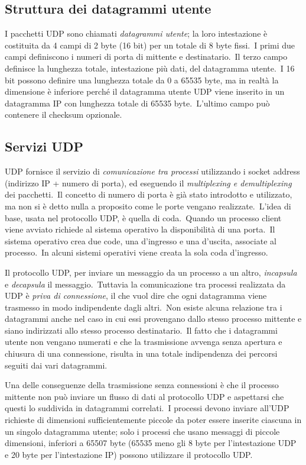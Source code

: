 \subsection{Struttura dei datagrammi utente}

I pacchetti UDP sono chiamati \emph{datagrammi utente}; la loro intestazione è costituita da 4 campi di 2 byte (16 bit) per un totale di 8 byte fissi.\
I primi due campi definiscono i numeri di porta di mittente e destinatario.\
Il terzo campo definisce la lunghezza totale, intestazione più dati, del datagramma utente.\
I 16 bit possono definire una lunghezza totale da 0 a 65535 byte, ma in realtà la dimensione è inferiore perché il datagramma utente UDP viene inserito in un datagramma IP con lunghezza totale di 65535 byte.\
L'ultimo campo può contenere il checksum opzionale.

\subsection{Servizi UDP}

UDP fornisce il servizio di \emph{comunicazione tra processi} utilizzando i socket address (indirizzo IP + numero di porta), ed eseguendo il \emph{multiplexing e demultiplexing} dei pacchetti.\
Il concetto di numero di porta è già stato introdotto e utilizzato, ma non si è detto nulla a proposito come le porte vengano realizzate.\
L'idea di base, usata nel protocollo UDP, è quella di coda.\
Quando un processo client viene avviato richiede al sistema operativo la disponibilità di una porta.\
Il sistema operativo crea due code, una d'ingresso e una d'uscita, associate al processo.\
In alcuni sistemi operativi viene creata la sola coda d'ingresso.

Il protocollo UDP, per inviare un messaggio da un processo a un altro, \emph{incapsula} e \emph{decapsula} il messaggio.\
Tuttavia la comunicazione tra processi realizzata da UDP è \emph{priva di connessione}, il che vuol dire che ogni datagramma viene trasmesso in modo indipendente dagli altri.\
Non esiste alcuna relazione tra i datagrammi anche nel caso in cui essi provengano dallo stesso processo mittente e siano indirizzati allo stesso processo destinatario.\
Il fatto che i datagrammi utente non vengano numerati e che la trasmissione avvenga senza apertura e chiusura di una connessione, risulta in una totale indipendenza dei percorsi seguiti dai vari datagrammi.

Una delle conseguenze della trasmissione senza connessioni è che il processo mittente non può inviare un flusso di dati al protocollo UDP e aspettarsi che questi lo suddivida in datagrammi correlati.\
I processi devono inviare all'UDP richieste di dimensioni sufficientemente piccole da poter essere inserite ciascuna in un singolo datagramma utente; solo i processi che usano messaggi di piccole dimensioni, inferiori a 65507 byte (65535 meno gli 8 byte per l'intestazione UDP e 20 byte per l'intestazione IP) possono utilizzare il protocollo UDP.

